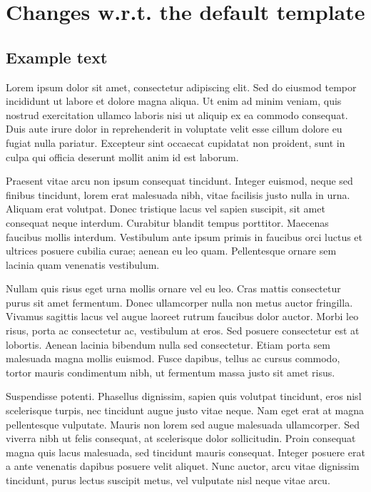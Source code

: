 

\chapter{Changes w.r.t. the default template}\label{ch:introduction}



\section{Example text}

Lorem ipsum dolor sit amet, consectetur adipiscing elit. Sed do eiusmod tempor
incididunt ut labore et dolore magna aliqua. Ut enim ad minim veniam, quis
nostrud exercitation ullamco laboris nisi ut aliquip ex ea commodo consequat.
Duis aute irure dolor in reprehenderit in voluptate velit esse cillum dolore eu
fugiat nulla pariatur. Excepteur sint occaecat cupidatat non proident, sunt in
culpa qui officia deserunt mollit anim id est laborum.

Praesent vitae arcu non ipsum consequat tincidunt. Integer euismod, neque sed
finibus tincidunt, lorem erat malesuada nibh, vitae facilisis justo nulla in
urna. Aliquam erat volutpat. Donec tristique lacus vel sapien suscipit, sit
amet consequat neque interdum. Curabitur blandit tempus porttitor. Maecenas
faucibus mollis interdum. Vestibulum ante ipsum primis in faucibus orci luctus
et ultrices posuere cubilia curae; aenean eu leo quam. Pellentesque ornare sem
lacinia quam venenatis vestibulum.

Nullam quis risus eget urna mollis ornare vel eu leo. Cras mattis consectetur
purus sit amet fermentum. Donec ullamcorper nulla non metus auctor fringilla.
Vivamus sagittis lacus vel augue laoreet rutrum faucibus dolor auctor. Morbi
leo risus, porta ac consectetur ac, vestibulum at eros. Sed posuere consectetur
est at lobortis. Aenean lacinia bibendum nulla sed consectetur. Etiam porta sem
malesuada magna mollis euismod. Fusce dapibus, tellus ac cursus commodo, tortor
mauris condimentum nibh, ut fermentum massa justo sit amet risus.

Suspendisse potenti. Phasellus dignissim, sapien quis volutpat tincidunt, eros
nisl scelerisque turpis, nec tincidunt augue justo vitae neque. Nam eget erat
at magna pellentesque vulputate. Mauris non lorem sed augue malesuada
ullamcorper. Sed viverra nibh ut felis consequat, at scelerisque dolor
sollicitudin. Proin consequat magna quis lacus malesuada, sed tincidunt mauris
consequat. Integer posuere erat a ante venenatis dapibus posuere velit aliquet.
Nunc auctor, arcu vitae dignissim tincidunt, purus lectus suscipit metus, vel
vulputate nisl neque vitae arcu.

